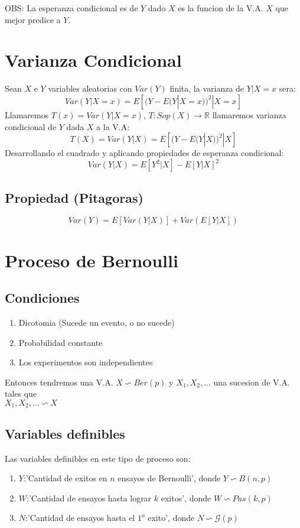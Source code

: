 \documentclass[titlepage,a4paper]{article}
\begin{document}
 OBS: La esperanza condicional es de $Y$ dado $X$ es la funcion de la V.A. $X$ que mejor predice a $Y$.
\section{Varianza Condicional}
Sean $X$ e $Y$ variables aleatorias con $Var(Y)$ finita, la varianza de $Y|X=x$ sera:
\begin{equation*}
    Var(Y|X=x)=E[(Y-E(Y|X=x))^{2}|X=x]
\end{equation*}
Llamaremos $T(x)=Var(Y|X=x)$, $T: Sop(X) \rightarrow \mathbb{R}$ llamaremos varianza condicional de $Y$ dada $X$ a la V.A:
\begin{equation*}
    T(X) = Var(Y|X) = E[(Y-E(Y|X))^{2}|X]
\end{equation*}
Desarrollando el cuadrado y aplicando propiedades de esperanza condicional:
\begin{equation*}
    Var(Y|X) = E[Y^{2}|X] - E[Y|X]^{2}
\end{equation*}
\subsection{Propiedad (Pitagoras)}
\begin{equation*}
    Var(Y) = E[Var(Y|X)] + Var(E[Y|X])
\end{equation*}
\section{Proceso de Bernoulli}
\subsection{Condiciones}
\begin{enumerate}
    \item Dicotomia (Sucede un evento, o no sucede)
    \item Probabilidad constante
    \item Los experimentos son independientes
\end{enumerate}
Entonces tendremos una V.A. $X \backsim Ber(p)$ y $X_{1},X_{2},...$ una sucesion de V.A.
tales que \\ $X_{1},X_{2},...\backsim X$
\subsection{Variables definibles}
Las variables definibles en este tipo de proceso son:
\begin{enumerate}
    \item $Y$:'Cantidad de exitos en $n$ ensayos de Bernoulli', donde $Y \backsim B(n,p)$
    \item $W$:'Cantidad de ensayos hasta lograr $k$ exitos', donde $W \backsim Pas(k,p)$
    \item $N$:'Cantidad de ensayos hasta el $1^{o}$ exito', donde $N \backsim \mathcal{G}(p)$
\end{enumerate}
\end{document}
